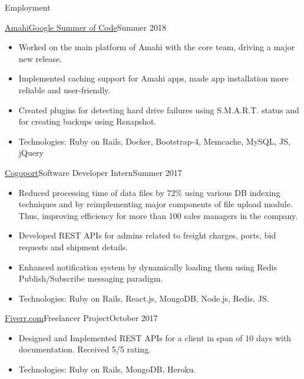 \documentclass[]{mcdowellcv}
\begin{document}
	\makeheader
	
	\begin{cvsection}{Employment}
		\begin{cvsubsection}{\href {https://summerofcode.withgoogle.com/organizations/4708787353550848/}{Amahi}}{\href {https://summerofcode.withgoogle.com/}{Google Summer of Code}}{Summer 2018}
			\begin{itemize}
				\item Worked on the main platform of Amahi with the core team, driving a major new release.
				\item Implemented caching support for Amahi apps, made app installation more reliable and user-friendly.
				\item Created plugins for detecting hard drive failures using S.M.A.R.T. status and for creating backups using Rsnapshot.
				\item Technologies: Ruby on Rails, Docker, Bootstrap-4, Memcache, MySQL, JS, jQuery
			\end{itemize}
		\end{cvsubsection}
		\begin{cvsubsection}{\href {http://www.cogoport.com/}{Cogoport}}{Software Developer Intern}{Summer 2017}			
			\begin{itemize}
				\item Reduced processing time of data files by 72\% using various DB indexing techniques and by reimplementing major components of file upload module. Thus, improving efficiency for more than 100 sales managers in the company.
				\item Developed REST APIs for admins related to freight charges, ports, bid requests and shipment details. 
				\item Enhanced notification system by dynamically loading them using Redis Publish/Subscribe messaging paradigm.			
				\item Technologies: Ruby on Rails, React.js, MongoDB, Node.js, Redis, JS.
			\end{itemize}
		\end{cvsubsection}
		\begin{cvsubsection}{\href {http://www.fiverr.com/}{Fiverr.com}}{Freelancer Project}{October 2017}			
			\begin{itemize}
				\item Designed and Implemented REST APIs for a client in span of 10 days with documentation. Received 5/5 rating.
				\item Technologies: Ruby on Rails, MongoDB, Heroku.
			\end{itemize}
		\end{cvsubsection}
	\end{cvsection}
	
\end{document}
